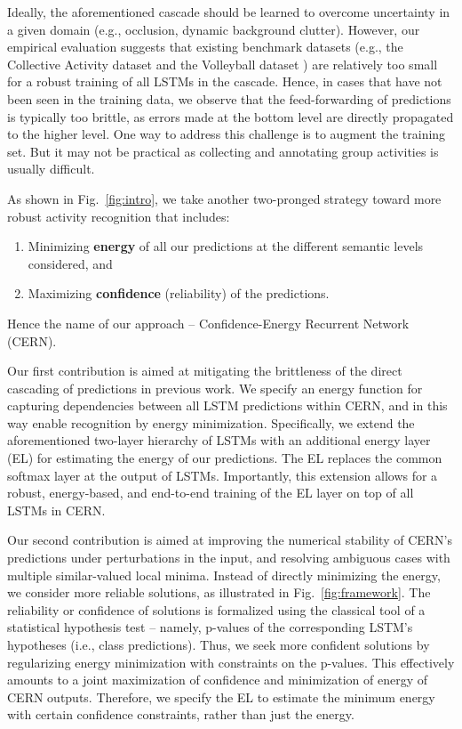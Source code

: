 \documentclass[10pt,twocolumn,letterpaper]{article}
\begin{document}
Ideally, the aforementioned cascade should be learned to overcome uncertainty in a given domain (e.g., occlusion, dynamic background clutter). However, our empirical evaluation suggests that existing benchmark datasets (e.g., the Collective Activity dataset \cite{Choi2009} and the Volleyball dataset \cite{Ibrahim2016}) are relatively too small for a robust training of all LSTMs in the cascade. Hence, in cases that have not been seen in the training data, we observe that the feed-forwarding of predictions is typically too brittle, as errors made at the bottom level are directly propagated to the higher level. One way to address this challenge is to augment the training set. But it may not be practical as collecting and annotating group activities is usually difficult.

As shown in Fig.~\ref{fig:intro}, we take another two-pronged strategy toward more robust activity recognition that includes: 
\begin{enumerate}[itemsep=-5pt,topsep=2pt, partopsep=1pt]
\item Minimizing {\bf energy} of all our predictions at the different semantic levels considered, and
\item Maximizing {\bf confidence} (reliability) of the predictions. 
\end{enumerate}
Hence the name of our approach -- Confidence-Energy Recurrent Network (CERN).

Our first contribution is aimed at mitigating the brittleness of the direct cascading of predictions in previous work. We specify an energy function for capturing dependencies between all LSTM predictions within CERN, and in this way enable recognition by energy minimization. Specifically, we extend the aforementioned two-layer hierarchy of LSTMs with an additional energy layer (EL) for estimating the energy of our predictions. The EL replaces the common softmax layer at the output of LSTMs. Importantly, this extension allows for a robust, energy-based, and end-to-end training of the EL layer on top of all LSTMs in CERN.

Our second contribution is aimed at improving the numerical stability of CERN's predictions under perturbations in the input, and resolving ambiguous cases with multiple similar-valued local minima. Instead of directly minimizing the energy, we consider more reliable solutions, as illustrated in Fig.~\ref{fig:framework}. The reliability or confidence of solutions is formalized using the classical tool of a statistical hypothesis test \cite{Fisher1950} -- namely, p-values of the corresponding LSTM's hypotheses (i.e., class predictions). Thus, we seek more confident solutions by regularizing energy minimization with constraints on the p-values. This effectively amounts to a joint maximization of confidence and minimization of energy of CERN outputs. Therefore, we specify the EL to estimate the minimum energy with certain confidence constraints, rather than just the energy. 
\end{document}
